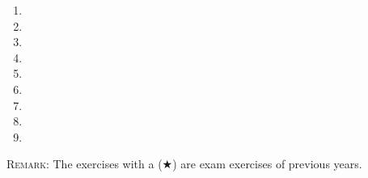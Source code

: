 \documentclass[a4paper,titlepage]{article}
\begin{document}
\begin{enumerate}[leftmargin=*,resume]
\item {}
\item {}
\item {}
\item {}
\item {}
\item {}
\item {}
\item {}
\item {}
\end{enumerate}

\vspace{2cm}

\textsc{Remark}: The exercises with a ($\bigstar$) are exam exercises of previous years.
\end{document}
